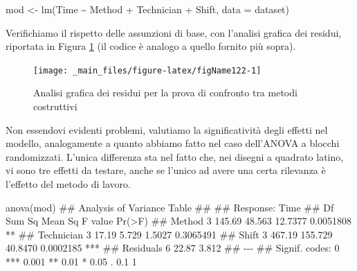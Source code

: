 \documentclass[a4paper,12pt,oneside]{book}
\newenvironment{Shaded}{\begin{snugshade}}{\end{snugshade}}
\newcommand{\SpecialCharTok}[1]{#1}
\newcommand{\DocumentationTok}[1]{#1}
\newcommand{\OtherTok}[1]{#1}
\newcommand{\FunctionTok}[1]{#1}
\newcommand{\AttributeTok}[1]{#1}
\newcommand{\NormalTok}[1]{#1}
\begin{document}
\begin{Shaded}
\begin{Highlighting}[]
\NormalTok{mod }\OtherTok{\textless{}{-}} \FunctionTok{lm}\NormalTok{(Time }\SpecialCharTok{\textasciitilde{}}\NormalTok{ Method }\SpecialCharTok{+}\NormalTok{ Technician}
          \SpecialCharTok{+}\NormalTok{ Shift, }\AttributeTok{data =}\NormalTok{ dataset)}
\end{Highlighting}
\end{Shaded}

Verifichiamo il rispetto delle assunzioni di base, con l'analisi grafica dei residui, riportata in Figura \ref{fig:figName122} (il codice è analogo a quello fornito più sopra).

\begin{figure}

{\centering \texttt{[image: \_main\_files/figure-latex/figName122-1]} 

}

\caption{Analisi grafica dei residui per la prova di confronto tra metodi costruttivi}\label{fig:figName122}
\end{figure}

Non essendovi evidenti problemi, valutiamo la significatività degli effetti nel modello, analogamente a quanto abbiamo fatto nel caso dell'ANOVA a blocchi randomizzati. L'unica differenza sta nel fatto che, nei disegni a quadrato latino, vi sono tre effetti da testare, anche se l'unico ad avere una certa rilevanza è l'effetto del metodo di lavoro.

\begin{Shaded}
\begin{Highlighting}[]
\FunctionTok{anova}\NormalTok{(mod)}
\DocumentationTok{\#\# Analysis of Variance Table}
\DocumentationTok{\#\# }
\DocumentationTok{\#\# Response: Time}
\DocumentationTok{\#\#            Df Sum Sq Mean Sq F value    Pr(\textgreater{}F)    }
\DocumentationTok{\#\# Method      3 145.69  48.563 12.7377 0.0051808 ** }
\DocumentationTok{\#\# Technician  3  17.19   5.729  1.5027 0.3065491    }
\DocumentationTok{\#\# Shift       3 467.19 155.729 40.8470 0.0002185 ***}
\DocumentationTok{\#\# Residuals   6  22.87   3.812                      }
\DocumentationTok{\#\# {-}{-}{-}}
\DocumentationTok{\#\# Signif. codes:  0 \textquotesingle{}***\textquotesingle{} 0.001 \textquotesingle{}**\textquotesingle{} 0.01 \textquotesingle{}*\textquotesingle{} 0.05 \textquotesingle{}.\textquotesingle{} 0.1 \textquotesingle{} \textquotesingle{} 1}
\end{Highlighting}
\end{Shaded}
\end{document}
